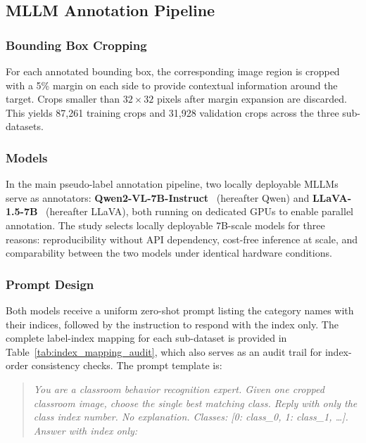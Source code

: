 \documentclass{ieeeaccess}
\begin{document}
\subsection{MLLM Annotation Pipeline}
\label{sec:annotation}

\subsubsection{Bounding Box Cropping}

For each annotated bounding box, the corresponding image region is
cropped with a 5\% margin on each side to provide contextual
information around the target.
Crops smaller than $32 \times 32$ pixels after margin expansion are
discarded.
This yields 87{,}261 training crops and 31{,}928 validation crops
across the three sub-datasets.

\subsubsection{Models}

In the main pseudo-label annotation pipeline, two locally deployable
MLLMs serve as annotators:
\textbf{Qwen2-VL-7B-Instruct}~\cite{bai2023qwen} (hereafter Qwen)
and \textbf{LLaVA-1.5-7B}~\cite{liu2023llava} (hereafter LLaVA),
both running on dedicated GPUs to enable parallel annotation.
The study selects locally deployable 7B-scale models for three reasons:
reproducibility without API dependency, cost-free inference at scale,
and comparability between the two models under identical hardware
conditions.

\subsubsection{Prompt Design}

Both models receive a uniform zero-shot prompt listing the category
names with their indices, followed by the instruction to respond with
the index only. The complete label-index mapping for each sub-dataset
is provided in Table~\ref{tab:index_mapping_audit}, which also serves
as an audit trail for index-order consistency checks.
The prompt template is:

\begin{quote}
\textit{You are a classroom behavior recognition expert.
Given one cropped classroom image, choose the single best matching
class. Reply with only the class index number. No explanation.
Classes: [0: class\_0, 1: class\_1, \ldots]. Answer with index only:}
\end{quote}
\end{document}
